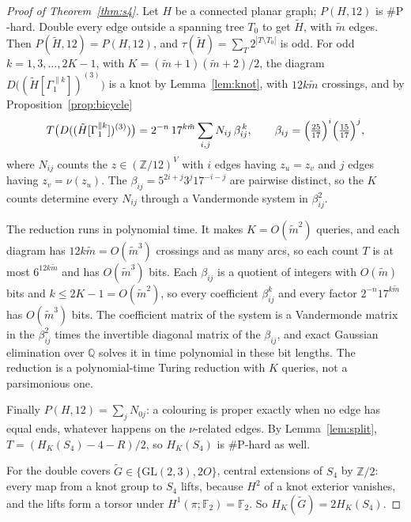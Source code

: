 \documentclass[11pt]{article}
\theoremstyle{definition}
\theoremstyle{remark}
\newcommand{\F}{\mathbb{F}}
\newcommand{\Z}{\mathbb{Z}}
\newcommand{\sharpP}{\#\mathrm{P}}
\begin{document}
\begin{proof}[Proof of Theorem~\ref{thm:s4}]
Let $H$ be a connected planar graph; $P(H,12)$ is $\sharpP$-hard. Double every
edge outside a spanning tree $T_0$ to get $\tilde H$, with $\tilde m$ edges.
Then $P(\tilde H,12)=P(H,12)$, and $\tau(\tilde H)=\sum_T2^{|T\setminus T_0|}$
is odd. For odd $k=1,3,\dots,2K-1$, with $K=(\tilde m+1)(\tilde m+2)/2$, the
diagram $D\bigl((\tilde H[\Gamma_1^{\parallel k}])^{(3)}\bigr)$ is a knot by
Lemma~\ref{lem:knot}, with $12k\tilde m$ crossings, and by
Proposition~\ref{prop:bicycle}
\[
T\bigl(D((\tilde H[\Gamma_1^{\parallel k}])^{(3)})\bigr)=
2^{-n}\,17^{k\tilde m}\sum_{i,j}N_{ij}\,\beta_{ij}^{\,k},
\qquad \beta_{ij}=\Bigl(\tfrac{25}{17}\Bigr)^{i}\Bigl(\tfrac{15}{17}\Bigr)^{j},
\]
where $N_{ij}$ counts the $z\in(\Z/12)^V$ with $i$ edges having $z_u=z_v$ and
$j$ edges having $z_v=\nu(z_u)$. The $\beta_{ij}=5^{2i+j}3^j17^{-i-j}$ are
pairwise distinct, so the $K$ counts determine every $N_{ij}$ through a
Vandermonde system in $\beta_{ij}^2$.

The reduction runs in polynomial time. It makes $K=O(\tilde m^2)$ queries,
and each diagram has $12k\tilde m=O(\tilde m^3)$ crossings and as many arcs,
so each count $T$ is at most $6^{12k\tilde m}$ and has $O(\tilde m^3)$ bits.
Each $\beta_{ij}$ is a quotient of integers with $O(\tilde m)$ bits and
$k\le2K-1=O(\tilde m^2)$, so every coefficient $\beta_{ij}^k$ and every factor
$2^{-n}17^{k\tilde m}$ has $O(\tilde m^3)$ bits. The coefficient matrix of the
system is a Vandermonde matrix in the $\beta_{ij}^2$ times the invertible
diagonal matrix of the $\beta_{ij}$, and exact Gaussian elimination over
$\mathbb{Q}$ solves it in time polynomial in these bit lengths. The reduction
is a polynomial-time Turing reduction with $K$ queries, not a parsimonious one.

Finally
$P(H,12)=\sum_jN_{0j}$: a colouring is proper exactly when no edge has equal
ends, whatever happens on the $\nu$-related edges. By Lemma~\ref{lem:split},
$T=(H_K(S_4)-4-R)/2$, so $H_K(S_4)$ is $\sharpP$-hard as well.

For the double covers $\tilde G\in\{\mathrm{GL}(2,3),2O\}$, central extensions
of $S_4$ by $\Z/2$: every map from a knot group to $S_4$ lifts, because
$H^2$ of a knot exterior vanishes, and the lifts form a torsor under
$H^1(\pi;\F_2)=\F_2$. So $H_K(\tilde G)=2H_K(S_4)$.


\end{proof}
\end{document}
